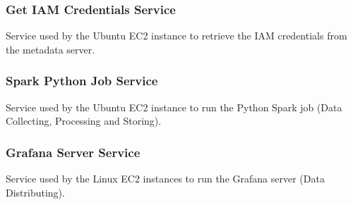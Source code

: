 \documentclass[12pt,oneside]{book} %
\begin{document}
\begin{subappendices}
    \subsubsection{Get IAM Credentials Service}
    Service used by the Ubuntu EC2 instance to retrieve the IAM credentials from
    the metadata server.
    

    \subsubsection{Spark Python Job Service}
    Service used by the Ubuntu EC2 instance to run the Python Spark job (Data
    Collecting, Processing and Storing).
    

    \newpage
    \subsubsection{Grafana Server Service}
    Service used by the Linux EC2 instances to run the Grafana server (Data
    Distributing).
    
\end{subappendices}
\end{document}
